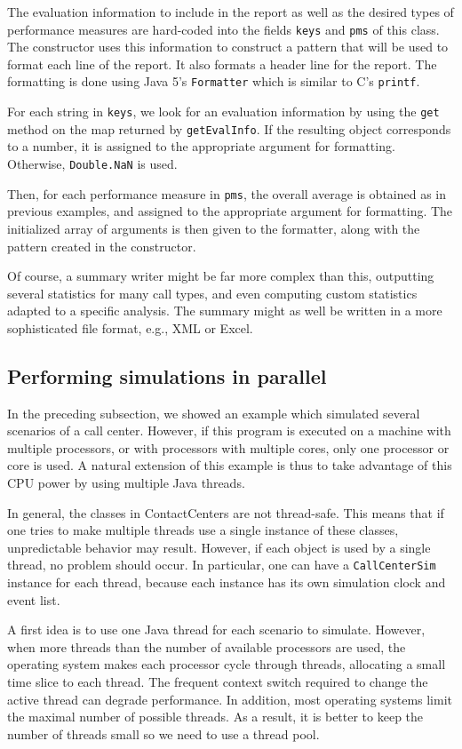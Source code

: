 The evaluation information to include in the report as well as the
desired types of performance measures are hard-coded into the fields
\texttt{keys} and \texttt{pms} of this class.
The constructor uses this information to construct a pattern that will
be used to format each line of the report.
It also formats a header line for the report.
The formatting is done using Java 5's \texttt{Formatter} which is
similar to C's \texttt{printf}.

For each string in \texttt{keys}, we look for an evaluation
information by using the \texttt{get} method on the map returned by
\texttt{get\-Eval\-Info}. If the resulting object corresponds to a
number, it is assigned to the appropriate argument for formatting.
Otherwise, \texttt{Double.NaN} is used.

Then, for each performance measure in \texttt{pms}, the overall
average is obtained as in previous examples, and assigned to the
appropriate argument for formatting.
The initialized array of arguments is then given to the formatter,
along with the pattern created in the constructor.

Of course,  a summary writer might be far more complex than this,
outputting several statistics for many call types, and even computing
custom statistics adapted to a specific analysis.
The summary might as well be written in a more sophisticated file
format, e.g., XML or Excel.

\subsection{Performing simulations in parallel}

In the preceding subsection, we showed an example which simulated
several scenarios of a call center.
However, if this program is executed on a machine with multiple
processors, or with processors with multiple cores, only one
processor or core is used.
A natural extension of this example is thus to take advantage of
this CPU power by using multiple Java threads.

In general, the classes in ContactCenters are not thread-safe.  This
means that if one tries to make multiple threads use a single instance
of these classes, unpredictable behavior may result.
However, if each object is used by a single thread, no problem should
occur.
In particular, one can have a \texttt{Call\-Center\-Sim} instance for
each thread, because each instance has its own simulation clock and
event list.

A first idea is to use one Java thread for each scenario to simulate.
However, when more threads than the number of available processors are
used, the operating system makes each processor cycle through threads,
allocating a small time slice to each thread.
The frequent context switch required to change the active thread can
degrade performance.
In addition, most operating systems limit the maximal number of
possible threads.
As a result, it is better to keep the number of threads small so we
need to use a thread pool.

